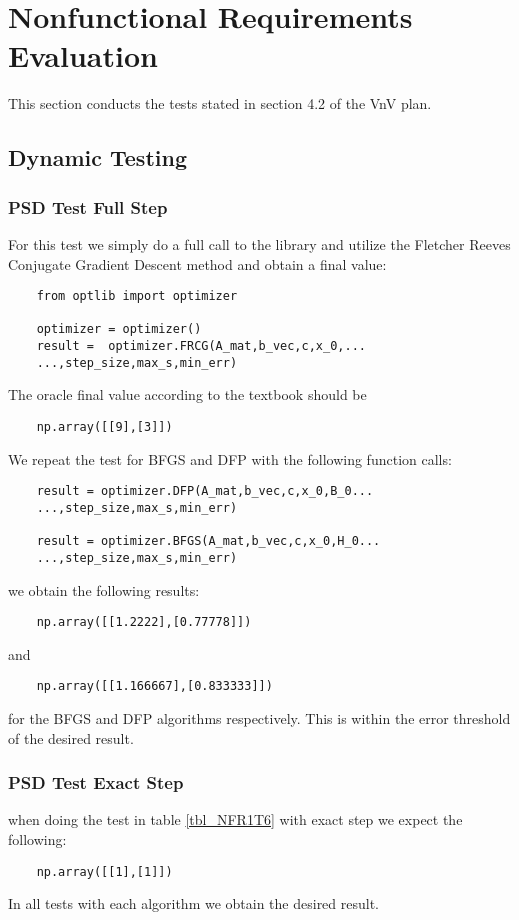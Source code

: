 \documentclass[12pt, titlepage]{article}
\begin{document}
\section{Nonfunctional Requirements Evaluation}
\label{sec:NFRE}
This section conducts the tests stated in section 4.2 of the VnV plan.
\subsection{Dynamic Testing}
\subsubsection{PSD Test Full Step}

For this test we simply do a full call to the library and utilize the Fletcher Reeves Conjugate Gradient Descent method and obtain a final value:

\begin{lstlisting}
    from optlib import optimizer
    
    optimizer = optimizer()
    result =  optimizer.FRCG(A_mat,b_vec,c,x_0,...
    ...,step_size,max_s,min_err)
\end{lstlisting}
The oracle final value according to the textbook should be 
\begin{verbatim}
    np.array([[9],[3]])
\end{verbatim}
We repeat the test for BFGS and DFP with the following function calls:

\begin{lstlisting}
    result = optimizer.DFP(A_mat,b_vec,c,x_0,B_0...
    ...,step_size,max_s,min_err)
    
    result = optimizer.BFGS(A_mat,b_vec,c,x_0,H_0...
    ...,step_size,max_s,min_err)
\end{lstlisting}

we obtain the following results: 
\begin{verbatim}
    np.array([[1.2222],[0.77778]])
\end{verbatim}
and 
\begin{verbatim}
    np.array([[1.166667],[0.833333]])
\end{verbatim}
for the BFGS and DFP algorithms respectively. This is within the error threshold of the desired result.
\subsubsection{PSD Test Exact Step}
when doing the test in table \ref{tbl_NFR1T6} with exact step we expect the following:
\begin{verbatim}
    np.array([[1],[1]])
\end{verbatim}
In all tests with each algorithm we obtain the desired result.
\end{document}
